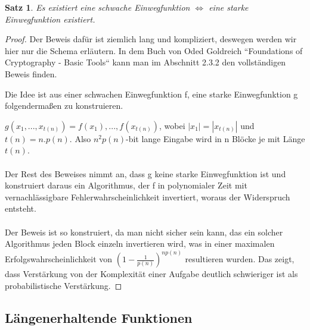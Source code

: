 \documentclass[12pt,a4paper]{article}
\newtheorem{theorem}{Satz}[section]
\theoremstyle{definition}
\begin{document}
    \begin{theorem}
        Es existiert eine schwache Einwegfunktion $\Leftrightarrow$ eine starke Einwegfunktion existiert.
    \end{theorem}
    \begin{proof}
        Der Beweis dafür ist ziemlich lang und kompliziert, deswegen werden wir hier nur die Schema erläutern. In
        dem Buch von Oded Goldreich ``Foundations of Cryptography - Basic Tools`` kann man im Abschnitt 2.3.2 den
        vollständigen Beweis finden.

        Die Idee ist aus einer schwachen Einwegfunktion f, eine starke Einwegfunktion g folgendermaßen zu konstruieren.

        $g(x_1, ..., x_{t(n)}) = f(x_1),...,f(x_{t(n)})$, wobei $|x_1| = |x_{t(n)}|$ und $t(n) = n . p(n)$. Also
        $n^2p(n)$-bit lange Eingabe wird in n Blöcke je mit Länge $t(n)$. \\ \\

        Der Rest des Beweises nimmt an, dass g keine starke Einwegfunktion ist und konstruiert daraus ein Algorithmus,
        der f in polynomialer Zeit mit vernachlässigbare Fehlerwahrscheinlichkeit invertiert, woraus der Widerspruch
        entsteht. \\ \\

        Der Beweis ist so konstruiert, da man nicht sicher sein kann, das ein solcher Algorithmus jeden Block
        einzeln invertieren wird, was in einer maximalen Erfolgswahrscheinlichkeit von $(1 - \frac{1}{p(n)})^{np(n)}$
        resultieren wurden. Das zeigt, dass Verstärkung von der Komplexität einer Aufgabe deutlich schwieriger ist
        als probabilistische Verstärkung.
    \end{proof}

    \subsection{Längenerhaltende Funktionen}
\end{document}
